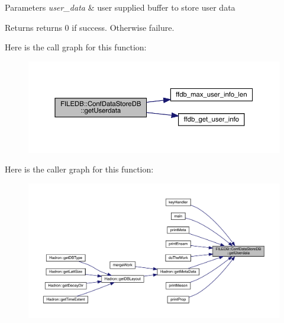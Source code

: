 \begin{DoxyParams}{Parameters}
{\em user\+\_\+data} & user supplied buffer to store user data \\
\hline
\end{DoxyParams}
\begin{DoxyReturn}{Returns}
returns 0 if success. Otherwise failure. 
\end{DoxyReturn}
Here is the call graph for this function\+:
\nopagebreak
\begin{figure}[H]
\begin{center}
\leavevmode
\includegraphics[width=350pt]{d8/d19/classFILEDB_1_1ConfDataStoreDB_abf7ce0847e1d68f960836826d68c0079_cgraph}
\end{center}
\end{figure}
Here is the caller graph for this function\+:\nopagebreak
\begin{figure}[H]
\begin{center}
\leavevmode
\includegraphics[width=350pt]{d8/d19/classFILEDB_1_1ConfDataStoreDB_abf7ce0847e1d68f960836826d68c0079_icgraph}
\end{center}
\end{figure}
\mbox{\label{classFILEDB_1_1ConfDataStoreDB_abf7ce0847e1d68f960836826d68c0079}} 
